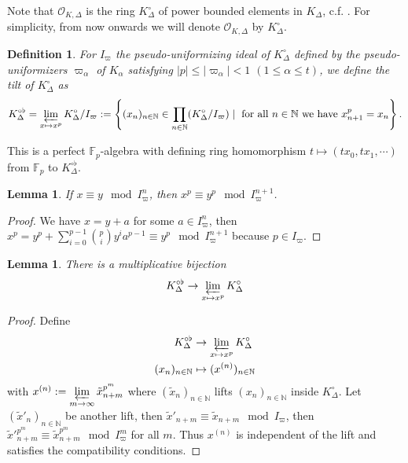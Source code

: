 \documentclass[12pts,a4paper]{amsart}
\newtheorem{lemma}[proposition]{Lemma}
\newtheorem{definition}[proposition]{Definition}
\begin{document}
Note that $\mathcal{O}_{K,\Delta}$ is the ring $K^\circ_\Delta$ of power bounded elements in $K_\Delta$, c.f. \cite{Wed}. For simplicity, from now onwards we will denote $\mathcal{O}_{K,\Delta}$ by $K^\circ_\Delta$.

\begin{definition}
	For $I_\varpi$ the pseudo-uniformizing ideal of $K^\circ_\Delta$ defined by the pseudo-uniformizers $\varpi_\alpha$ of $K_\alpha$ satisfying $|p|\leq |\varpi_\alpha|<1$ $(1\leq\alpha\leq t)$, we define the tilt of $K^\circ_\Delta$ as 
	\begin{align*}
		K^{\circ\flat}_\Delta=\varprojlim\limits_{x\mapsto x^p}K^\circ_\Delta/I_\varpi:=\left\{(x_n)_{n\in\mathbb{N}}\in \prod\limits_{n\in\mathbb{N}}(K^\circ_\Delta/I_\varpi)\mid \text{ for all $n\in\mathbb{N}$ we have } x^p_{n+1}=x_n\right\}.
	\end{align*}
\end{definition}
This is a perfect $\mathbb{F}_p$-algebra with defining ring homomorphism $t\mapsto (tx_0,tx_1,\cdots)$ from $\mathbb{F}_p$ to $K^{\circ\flat}_\Delta$. 

\begin{lemma}
    If $x\equiv y\mod I^n_\varpi$, then $x^p\equiv y^p\mod I^{n+1}_\varpi$.
\end{lemma}

\begin{proof}
    We have $x=y+a$ for some $a\in I^n_\varpi$, then $x^p=y^p+\sum\limits_{i=0}^{p-1} {p\choose i}y^ia^{p-1}\equiv y^p\mod I^{n+1}_\varpi$ because $p\in I_\varpi$.
\end{proof}

\begin{lemma}
	There is a multiplicative bijection
	\begin{align*}
		K^{\circ\flat}_\Delta\to \varprojlim\limits_{x\mapsto x^p}K^\circ_\Delta
	\end{align*}
\end{lemma}

\begin{proof}
	Define
	\begin{align*}
		K^{\circ\flat}_\Delta&\to\varprojlim\limits_{x\mapsto x^p}K^\circ_\Delta\\
		          (x_n)_{n\in\mathbb{N}}&\mapsto (x^{(n)})_{n\in\mathbb{N}}
	\end{align*}
	with $x^{(n)}:=\varprojlim\limits_{m\to\infty }\tilde{x}^{p^m}_{n+m}$ where $(\tilde{x}_n)_{n\in\mathbb{N}}$ lifts $(x_n)_{n\in\mathbb{N}}$ inside $K^\circ_\Delta$. Let $(\tilde{x}'_n)_{n\in\mathbb{N}}$ be another lift, then $\tilde{x}'_{n+m}\equiv \tilde{x}_{n+m}\mod I_\varpi$, then $\tilde{x}'^{p^m}_{n+m}\equiv \tilde{x}^{p^m}_{n+m}\mod I^{m}_\varpi$ for all $m$. Thus $x^{(n)}$ is independent of the lift and satisfies the compatibility conditions.
\end{proof}
\end{document}

